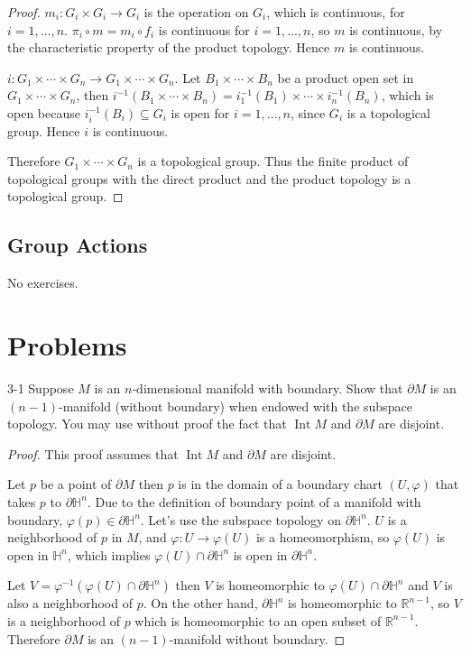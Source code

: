 \begin{proof}
    $m_{i}: G_{i}\times G_{i}\to G_{i}$ is the operation on $G_{i}$, which is continuous, for $i = 1, \ldots, n$. $\pi_{i}\circ m = m_{i}\circ f_{i}$ is continuous for $i = 1, \ldots, n$, so $m$ is continuous, by the characteristic property of the product topology. Hence $m$ is continuous.

    $i: G_{1}\times\cdots\times G_{n}\to G_{1}\times\cdots\times G_{n}$. Let $B_{1}\times\cdots\times B_{n}$ be a product open set in $G_{1}\times\cdots\times G_{n}$, then $i^{-1}(B_{1}\times\cdots\times B_{n}) = i_{1}^{-1}(B_{1})\times\cdots\times i_{n}^{-1}(B_{n})$, which is open because $i_{i}^{-1}(B_{i})\subseteq G_{i}$ is open for $i = 1,\ldots,n$, since $G_{i}$ is a topological group. Hence $i$ is continuous.

    Therefore $G_{1}\times\cdots\times G_{n}$ is a topological group. Thus the finite product of topological groups with the direct product and the product topology is a topological group.
\end{proof}

\subsection*{Group Actions}

No exercises.

\section*{Problems}

\begin{problem}{3-1}
Suppose $M$ is an $n$-dimensional manifold with boundary. Show that $\partial M$ is an $(n-1)$-manifold (without boundary) when endowed with the subspace topology. You may use without proof the fact that $\operatorname{Int}M$ and $\partial M$ are disjoint.
\end{problem}

\begin{proof}
    This proof assumes that $\operatorname{Int}M$ and $\partial M$ are disjoint.

    Let $p$ be a point of $\partial M$ then $p$ is in the domain of a boundary chart $(U, \varphi)$ that takes $p$ to $\partial\mathbb{H}^{n}$. Due to the definition of boundary point of a manifold with boundary, $\varphi(p) \in \partial\mathbb{H}^{n}$. Let's use the subspace topology on $\partial\mathbb{H}^{n}$. $U$ is a neighborhood of $p$ in $M$, and $\varphi: U \to \varphi(U)$ is a homeomorphism, so $\varphi(U)$ is open in $\mathbb{H}^{n}$, which implies $\varphi(U) \cap \partial\mathbb{H}^{n}$ is open in $\partial\mathbb{H}^{n}$.

    Let $V = \varphi^{-1}(\varphi(U) \cap \partial\mathbb{H}^{n})$ then $V$ is homeomorphic to $\varphi(U) \cap \partial\mathbb{H}^{n}$ and $V$ is also a neighborhood of $p$. On the other hand, $\partial\mathbb{H}^{n}$ is homeomorphic to $\mathbb{R}^{n-1}$, so $V$ is a neighborhood of $p$ which is homeomorphic to an open subset of $\mathbb{R}^{n-1}$. Therefore $\partial M$ is an $(n-1)$-manifold without boundary.
\end{proof}

